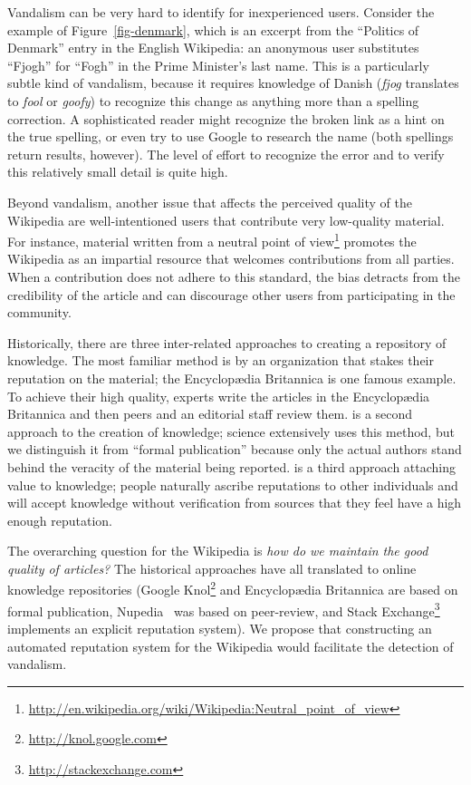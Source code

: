Vandalism can be very hard to identify for inexperienced users.
Consider the example of Figure~\ref{fig-denmark},
which is an excerpt from the ``Politics of Denmark''
entry in the English Wikipedia: an anonymous user substitutes
``Fjogh'' for ``Fogh'' in the Prime Minister's last name.
This is a particularly subtle kind of vandalism,
because it requires knowledge of Danish
(\textit{fjog} translates to \textit{fool} or \textit{goofy})
to recognize this change as anything more than a spelling correction.
A sophisticated reader might recognize the broken link
as a hint on the true spelling, or even try to use Google
to research the name (both spellings return results, however).
The level of effort to recognize the error and to
verify this relatively small detail is quite high.

Beyond vandalism, another issue that affects the perceived
quality of the Wikipedia are well-intentioned users that contribute
very low-quality material.
For instance, material written from a
neutral point of view\footnote{\url{http://en.wikipedia.org/wiki/Wikipedia:Neutral_point_of_view}}
promotes the Wikipedia as an impartial resource that welcomes contributions
from all parties.
When a contribution does not adhere to this standard, the bias
detracts from the credibility of the article and can discourage
other users from participating in the community.

Historically, there are three inter-related approaches to
creating a repository of knowledge.
The most familiar method is  by an organization
that stakes their reputation on the material;
the Encyclop{\ae}dia Britannica is one famous example.
To achieve their high quality, experts write the articles in the
Encyclop{\ae}dia Britannica
and then peers and an editorial staff review them.
 is a second approach to the creation of
knowledge; science extensively uses this method,
but we distinguish it from ``formal publication'' because
only the actual authors stand behind the veracity of the
material being reported.
 is a third approach attaching value
to knowledge; people naturally ascribe reputations to other
individuals and will accept knowledge without verification from
sources that they feel have a high enough reputation.

The overarching question for the Wikipedia is
\textit{how do we maintain the good quality of articles?}
The historical approaches have all translated to online
knowledge repositories (\eg Google Knol\footnote{\url{http://knol.google.com}}
and Encyclop{\ae}dia Britannica
are based on formal publication,
Nupedia~\cite{wiki:Nupedia}
was based on peer-review,
and Stack Exchange\footnote{\url{http://stackexchange.com}}
implements an explicit reputation system).
We propose that constructing an automated reputation system
for the Wikipedia would facilitate the detection of vandalism.

